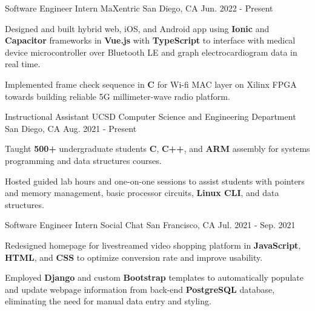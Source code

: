 

\begin{cventries}

\cventry
  {Software Engineer Intern} %
  {MaXentric} %
  {San Diego, CA} %
  {Jun. 2022 - Present} %
  {
    \begin{cvitems} %
      \item {Designed and built hybrid web, iOS, and Android app using \textbf{Ionic} and \textbf{Capacitor} frameworks in \textbf{Vue.js} with \textbf{TypeScript} to interface with medical device microcontroller over Bluetooth LE and graph electrocardiogram data in real time.}
      \item {Implemented frame check sequence in \textbf{C} for Wi-fi MAC layer on Xilinx FPGA towards building reliable 5G millimeter-wave radio platform.}
    \end{cvitems}
  }


\cventry
  {Instructional Assistant} %
  {UCSD Computer Science and Engineering Department} %
  {San Diego, CA} %
  {Aug. 2021 - Present} %
  {
    \begin{cvitems} %
      \item {Taught \textbf{500+} undergraduate students \textbf{C}, \textbf{C++}, and \textbf{ARM} assembly for systems programming and data structures courses.}
      \item {Hosted guided lab hours and one-on-one sessions to assist students with pointers and memory management, basic processor circuits, \textbf{Linux CLI}, and data structures.}
    \end{cvitems}
  }


\cventry
  {Software Engineer Intern} %
  {Social Chat} %
  {San Francisco, CA} %
  {Jul. 2021 - Sep. 2021} %
  {
    \begin{cvitems} %
      \item {Redesigned homepage for livestreamed video shopping platform in \textbf{JavaScript}, \textbf{HTML}, and \textbf{CSS} to optimize conversion rate and improve usability.}
      \item {Employed \textbf{Django} and custom \textbf{Bootstrap} templates to automatically populate and update webpage information from back-end \textbf{PostgreSQL} database, eliminating the need for manual data entry and styling.}
    \end{cvitems}
  }


\end{cventries}
